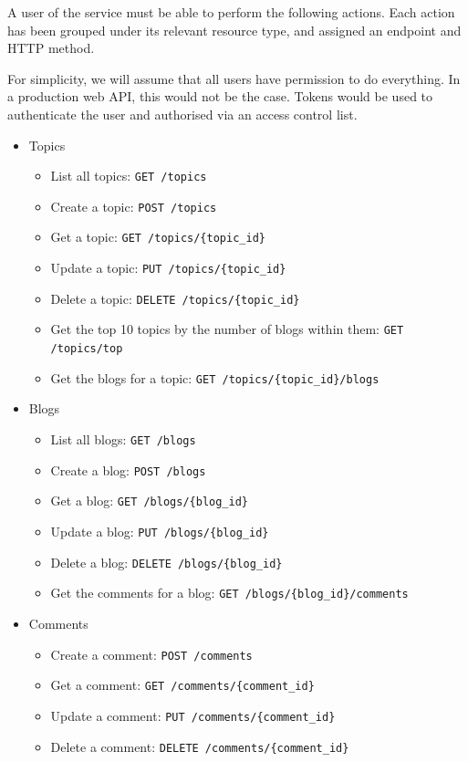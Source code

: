 \documentclass[]{full}
\theoremstyle{definition}
\begin{document}
A user of the service must be able to perform the following actions. Each action has been grouped under its relevant resource type, and assigned an endpoint and HTTP method.

For simplicity, we will assume that all users have permission to do everything. In a production web API, this would not be the case. Tokens would be used to authenticate the user and authorised via an access control list.

\begin{itemize}
    \item Topics
    \begin{itemize}
        \item List all topics: \verb|GET /topics|
        \item Create a topic: \verb|POST /topics|
        \item Get a topic: \verb|GET /topics/{topic_id}|
        \item Update a topic: \verb|PUT /topics/{topic_id}|
        \item Delete a topic: \verb|DELETE /topics/{topic_id}|
        \item Get the top 10 topics by the number of blogs within them: \verb|GET /topics/top|
        \item Get the blogs for a topic: \verb|GET /topics/{topic_id}/blogs|
    \end{itemize}
    \item Blogs
    \begin{itemize}
        \item List all blogs: \verb|GET /blogs|
        \item Create a blog: \verb|POST /blogs|
        \item Get a blog: \verb|GET /blogs/{blog_id}|
        \item Update a blog: \verb|PUT /blogs/{blog_id}|
        \item Delete a blog: \verb|DELETE /blogs/{blog_id}|
        \item Get the comments for a blog: \verb|GET /blogs/{blog_id}/comments|
    \end{itemize}
    \item Comments
    \begin{itemize}
        \item Create a comment: \verb|POST /comments|
        \item Get a comment: \verb|GET /comments/{comment_id}|
        \item Update a comment: \verb|PUT /comments/{comment_id}|
        \item Delete a comment: \verb|DELETE /comments/{comment_id}|
    \end{itemize}
\end{itemize}
\end{document}
